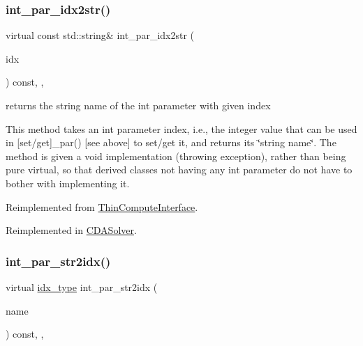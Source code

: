 \subsubsection{\texorpdfstring{int\+\_\+par\+\_\+idx2str()}{int\_par\_idx2str()}}
{\footnotesize\ttfamily virtual const std\+::string\& int\+\_\+par\+\_\+idx2str (\begin{DoxyParamCaption}\item[{const \mbox{\hyperlink{class_s_m_spp__di__unipi__it_1_1_thin_compute_interface_aa3d710629ad8c434286726ad810c3b47}{idx\+\_\+type}}}]{idx }\end{DoxyParamCaption}) const\hspace{0.3cm}{\ttfamily [inline]}, {\ttfamily [override]}, {\ttfamily [virtual]}}



returns the string name of the int parameter with given index 

This method takes an int parameter index, i.\+e., the integer value that can be used in \mbox{[}set/get\mbox{]}\+\_\+par() \mbox{[}see above\mbox{]} to set/get it, and returns its \char`\"{}string name\char`\"{}. The method is given a void implementation (throwing exception), rather than being pure virtual, so that derived classes not having any int parameter do not have to bother with implementing it. 

Reimplemented from \mbox{\hyperlink{class_s_m_spp__di__unipi__it_1_1_thin_compute_interface_a3d3d1ca3218d2d640614ed75a960ef01}{Thin\+Compute\+Interface}}.



Reimplemented in \mbox{\hyperlink{class_s_m_spp__di__unipi__it_1_1_c_d_a_solver_a61e973f39747f63b8f56d97cc62e32ce}{C\+D\+A\+Solver}}.

\mbox{\label{class_s_m_spp__di__unipi__it_1_1_solver_ae281b6699b0707a5cdc1e82b76d26c09}} 
\subsubsection{\texorpdfstring{int\+\_\+par\+\_\+str2idx()}{int\_par\_str2idx()}}
{\footnotesize\ttfamily virtual \mbox{\hyperlink{class_s_m_spp__di__unipi__it_1_1_thin_compute_interface_aa3d710629ad8c434286726ad810c3b47}{idx\+\_\+type}} int\+\_\+par\+\_\+str2idx (\begin{DoxyParamCaption}\item[{const std\+::string \&}]{name }\end{DoxyParamCaption}) const\hspace{0.3cm}{\ttfamily [inline]}, {\ttfamily [override]}, {\ttfamily [virtual]}}



